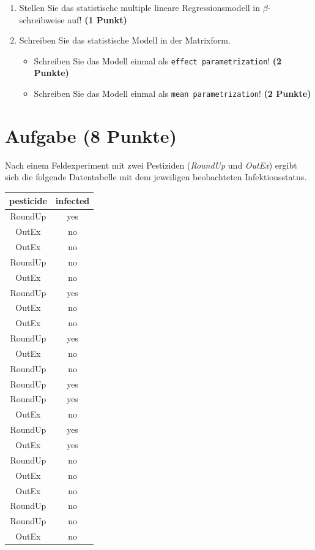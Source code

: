 \documentclass[a4paper, 10pt]{scrartcl}\usepackage[]{graphicx}\usepackage[]{xcolor}
\begin{document}
\begin{enumerate}
\item Stellen Sie das statistische multiple lineare Regressionsmodell in
  $\beta$-schreibweise auf! \textbf{(1 Punkt)}
\item Schreiben Sie das statistische Modell in der Matrixform.
  \begin{itemize}
  \item Schreiben Sie das Modell einmal als \texttt{effect parametrization}! \textbf{(2 Punkte)}
  \item Schreiben Sie das Modell einmal als \texttt{mean parametrization}! \textbf{(2 Punkte)}
  \end{itemize}
\end{enumerate} 
\clearpage

\section{Aufgabe \hfill (8 Punkte)}

Nach einem Feldexperiment mit zwei Pestiziden (\textit{RoundUp} und
\textit{OutEx}) ergibt sich die folgende Datentabelle mit dem jeweiligen
beobachteten Infektionsstatus.

\begin{table}[!h]
\centering
\begin{tabular}{cc}
\toprule
pesticide & infected\\
\midrule
RoundUp & yes\\
OutEx & no\\
OutEx & no\\
RoundUp & no\\
OutEx & no\\
\addlinespace
RoundUp & yes\\
OutEx & no\\
OutEx & no\\
RoundUp & yes\\
OutEx & no\\
\addlinespace
RoundUp & no\\
RoundUp & yes\\
RoundUp & yes\\
OutEx & no\\
RoundUp & yes\\
\addlinespace
OutEx & yes\\
RoundUp & no\\
OutEx & no\\
OutEx & no\\
RoundUp & no\\
\addlinespace
RoundUp & no\\
OutEx & no\\
\bottomrule
\end{tabular}
\end{table}
\end{document}
